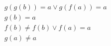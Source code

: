 \begin{align*}
%
& g(g(b)) = a \lor g(f(a)) = a
~\\~
& g(b) = a
~\\~
& f(b)  \neq  f(b) \lor f(a) = a
~\\~
& g(a)  \neq  a
%
\end{align*}
